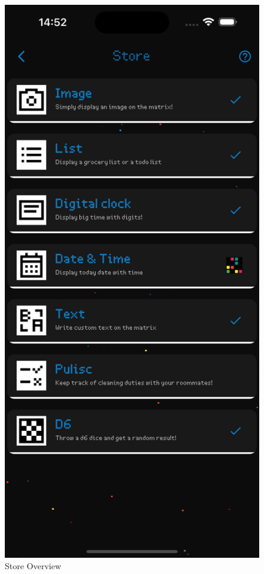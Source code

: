 \begin{figure}[h]
\begin{minipage}[b]{0.32\textwidth}
        \caption*{Store Overview}
    \end{minipage}
    \begin{minipage}[b]{0.32\textwidth}
        \centering
        \includegraphics[width=\textwidth]{tesi/img/client_demo/store/widget_installing.png}

\end{minipage}
\end{figure}

